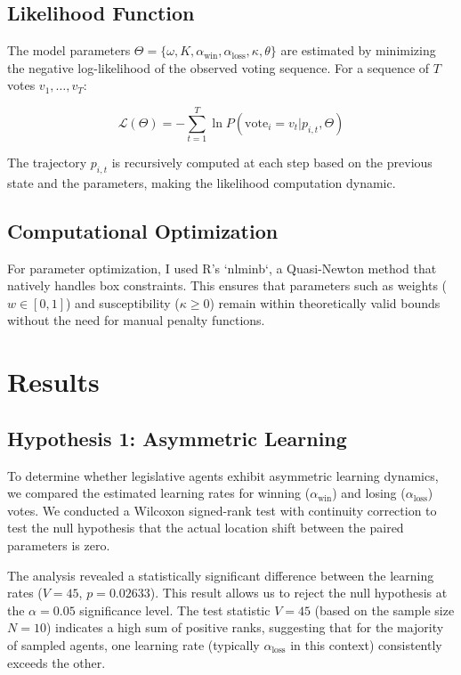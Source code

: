 \documentclass{article}
\begin{document}
	\subsection{Likelihood Function}
	The model parameters $\Theta = \{\omega, K, \alpha_{\text{win}}, \alpha_{\text{loss}}, \kappa, \theta\}$ are estimated by minimizing the negative log-likelihood of the observed voting sequence. For a sequence of $T$ votes $v_1, \dots, v_T$:
	
	\begin{equation}
		\mathcal{L}(\Theta) = - \sum_{t=1}^{T} \ln P(\text{vote}_i = v_t | p_{i,t}, \Theta)
	\end{equation}
	
	The trajectory $p_{i,t}$ is recursively computed at each step based on the previous state and the parameters, making the likelihood computation dynamic.
	
	\subsection{Computational Optimization}
	
	For parameter optimization, I used R's `nlminb`, a Quasi-Newton method that natively handles box constraints. This ensures that parameters such as weights ($w \in [0,1]$) and susceptibility ($\kappa \geq 0$) remain within theoretically valid bounds without the need for manual penalty functions.
	
	\section{Results}
	
	\subsection{Hypothesis 1: Asymmetric Learning}
	To determine whether legislative agents exhibit asymmetric learning dynamics, we compared the estimated learning rates for winning ($\alpha_{\text{win}}$) and losing ($\alpha_{\text{loss}}$) votes. We conducted a Wilcoxon signed-rank test with continuity correction to test the null hypothesis that the actual location shift between the paired parameters is zero.
	
	The analysis revealed a statistically significant difference between the learning rates ($V = 45$, $p = 0.02633$). This result allows us to reject the null hypothesis at the $\alpha = 0.05$ significance level. The test statistic $V = 45$ (based on the sample size $N=10$) indicates a high sum of positive ranks, suggesting that for the majority of sampled agents, one learning rate (typically $\alpha_{\text{loss}}$ in this context) consistently exceeds the other.
	
\end{document}
